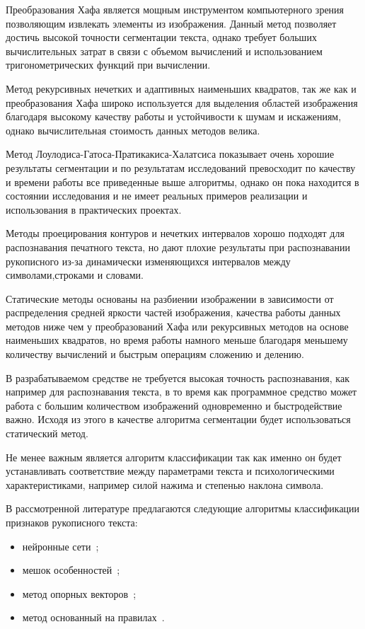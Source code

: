 Преобразования Хафа является мощным инструментом компьютерного зрения позволяющим извлекать элементы из изображения. Данный метод позволяет достичь высокой точности сегментации текста, однако требует больших вычислительных затрат в связи с объемом вычислений и использованием тригонометрических функций при вычислении.

Метод рекурсивных нечетких и адаптивных наименьших квадратов, так же как и преобразования Хафа широко используется для выделения областей изображения благодаря высокому качеству работы и устойчивости к шумам и искажениям, однако вычислительная стоимость данных методов велика.

Метод Лоулодиса-Гатоса-Пратикакиса-Халатсиса показывает очень хорошие результаты сегментации и по результатам исследований превосходит по качеству и времени работы все приведенные выше алгоритмы, однако он пока находится в состоянии исследования и не имеет реальных примеров реализации и использования в практических проектах.

Методы проецирования контуров и нечетких интервалов хорошо подходят для распознавания печатного текста, но дают плохие результаты при распознавании рукописного из-за динамически изменяющихся интервалов между символами,строками и словами.

Статические методы основаны на разбиении изображении в зависимости от распределения средней яркости частей изображения, качества работы данных методов ниже чем у преобразований Хафа или рекурсивных методов на основе наименьших квадратов, но время работы намного меньше благодаря меньшему количеству вычислений и быстрым операциям сложению и делению.

В разрабатываемом средстве не требуется высокая точность распознавания, как например для распознавания текста, в то время как программное средство может работа с большим количеством изображений одновременно и быстродействие важно. Исходя из этого в качестве алгоритма сегментации будет использоваться статический метод.

Не менее важным является алгоритм классификации так как именно он будет устанавливать соответствие между параметрами текста и психологическими характеристиками, например силой нажима и степенью наклона символа.

В рассмотренной литературе предлагаются следующие алгоритмы классификации признаков рукописного текста:
\begin{itemize}
  \item нейронные сети~\cite{champa_ananda_kumar_ann, grewal_prashar, gabrani_solomon_dviwe,puri_lakhwani, dang_kumar, kathait_singh};
  \item мешок особенностей~\cite{rothacker_bag_of_features};
  \item метод опорных векторов~\cite{slideshare_khandelwal_garg, gabrani_solomon_dviwe, prasad_singh_sapre};
  \item метод основанный на правилах~\cite{champa_ananda_kumar_rule_base}.
\end{itemize}

